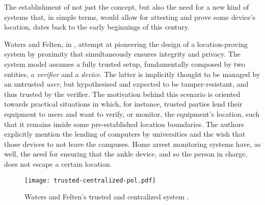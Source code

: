 The establishment of not just the concept, but also the need for a new kind of systems that, in simple terms, would allow for attesting and prove some device's location, dates back to the early beginnings of this century. 

Waters and Felten, in \cite{waters2003secure}, attempt at pioneering the design of a location-proving system by proximity that simultaneously ensures integrity and privacy. The system model assumes a fully trusted setup, fundamentally composed by two entities, a \emph{verifier} and a \emph{device}. The latter is implicitly thought to be managed by an untrusted \emph{user}, but hypothesised and expected to be tamper-resistant, and thus trusted by the verifier. The motivation behind this scenario is oriented towards practical situations in which, for instance, trusted parties lend their equipment to users and want to verify, or monitor, the equipment's location, such that it remains inside some pre-established location boundaries. The authors explicitly mention the lending of computers by universities and the wish that those devices to not leave the campuses. Home arrest monitoring systems have, as well, the need for ensuring that the ankle device, and so the person in charge, does not escape a certain location. 

\begin{figure}[ht]
    \begin{center}
    \texttt{[image: trusted-centralized-pol.pdf]}
    \caption{Waters and Felten's trusted and centralized \pol{} system \cite{waters2003secure}.}
    \label{fig:trusted-centralized-pol}
    \end{center}
\end{figure}

